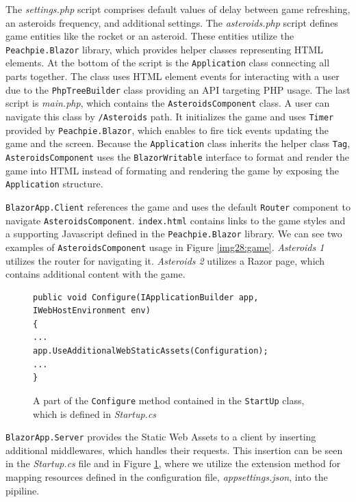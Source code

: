 The \textit{settings.php} script comprises default values of delay between game refreshing, an asteroids frequency, and additional settings.
The \textit{asteroids.php} script defines game entities like the rocket or an asteroid.
These entities utilize the \texttt{Peachpie.Blazor} library, which provides helper classes representing HTML elements.
At the bottom of the script is the \texttt{Application} class connecting all parts together.
The class uses HTML element events for interacting with a user due to the \texttt{PhpTreeBuilder} class providing an API targeting PHP usage.
The last script is \textit{main.php}, which contains the \texttt{AsteroidsComponent} class.
A user can navigate this class by \texttt{/Asteroids} path.
It initializes the game and uses \texttt{Timer} provided by \texttt{Peachpie.Blazor}, which enables to fire tick events updating the game and the screen.
Because the \texttt{Application} class inherits the helper class \texttt{Tag}, \texttt{AsteroidsComponent} uses the \texttt{BlazorWritable} interface to format and render the game into HTML instead of formating and rendering the game by exposing the \texttt{Application} structure.
\par
\texttt{BlazorApp.Client} references the game and uses the default \texttt{Router} component to navigate \texttt{AsteroidsComponent}.
\texttt{index.html} contains links to the game styles and a supporting Javascript defined in the \texttt{Peachpie.Blazor} library.
We can see two examples of \texttt{AsteroidsComponent} usage in Figure \ref{img28:game}.
\textit{Asteroids 1} utilizes the router for navigating it.
\textit{Asteroids 2} utilizes a Razor page, which contains additional content with the game.
\par
\begin{figure}
\begin{lstlisting}
public void Configure(IApplicationBuilder app, 
IWebHostEnvironment env)
{
...
app.UseAdditionalWebStaticAssets(Configuration);
...
}
\end{lstlisting}
\caption{A part of the \texttt{Configure} method contained in the \texttt{StartUp} class, which is defined in \textit{Startup.cs}}
\label{img21:server}
\end{figure}
\par
\texttt{BlazorApp.Server} provides the Static Web Assets to a client by inserting additional middlewares, which handles their requests.
This insertion can be seen in the \textit{Startup.cs} file and in Figure \ref{img21:server}, where we utilize the extension method for mapping resources defined in the configuration file, \textit{appsettings.json}, into the pipiline.

